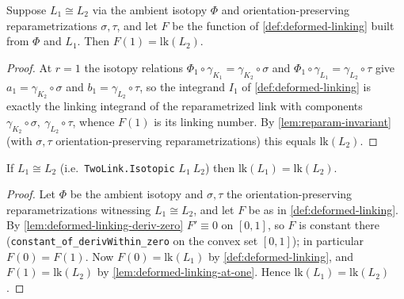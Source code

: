 \begin{lemma}[The deformed linking integral at $r=1$]
    \label{lem:deformed-linking-at-one}
    Suppose $L_1\cong L_2$ via the ambient isotopy $\Phi$ and orientation-preserving
    reparametrizations $\sigma,\tau$, and let $F$ be the function of
    \cref{def:deformed-linking} built from $\Phi$ and $L_1$. Then
    $F(1) = \mathrm{lk}(L_2)$.
\end{lemma}
\begin{proof}
    At $r=1$ the isotopy relations
    $\Phi_1\circ\gamma_{K_1}=\gamma_{K_2}\circ\sigma$ and
    $\Phi_1\circ\gamma_{L_1}=\gamma_{L_2}\circ\tau$ give $a_1=\gamma_{K_2}\circ\sigma$
    and $b_1=\gamma_{L_2}\circ\tau$, so the integrand $I_1$ of
    \cref{def:deformed-linking} is exactly the linking integrand of the
    reparametrized link with components $\gamma_{K_2}\circ\sigma,\
    \gamma_{L_2}\circ\tau$, whence $F(1)$ is its linking number. By
    \cref{lem:reparam-invariant} (with $\sigma,\tau$ orientation-preserving
    reparametrizations) this equals $\mathrm{lk}(L_2)$.
\end{proof}

\begin{theorem}
    \label{thm:linking-isotopy-invariant}
    \leanfile{LeanEval/KnotTheory/Linking.lean}
    If $L_1 \cong L_2$ (i.e.\ \texttt{TwoLink.Isotopic} $L_1\ L_2$) then
    $\mathrm{lk}(L_1) = \mathrm{lk}(L_2)$.
\end{theorem}
\begin{proof}
    Let $\Phi$ be the ambient isotopy and $\sigma,\tau$ the orientation-preserving
    reparametrizations witnessing $L_1\cong L_2$, and let $F$ be as in
    \cref{def:deformed-linking}. By \cref{lem:deformed-linking-deriv-zero}
    $F'\equiv 0$ on $[0,1]$, so $F$ is constant there
    (\texttt{constant\_of\_derivWithin\_zero} on the convex set $[0,1]$); in
    particular $F(0)=F(1)$. Now $F(0)=\mathrm{lk}(L_1)$ by
    \cref{def:deformed-linking}, and $F(1)=\mathrm{lk}(L_2)$ by
    \cref{lem:deformed-linking-at-one}. Hence $\mathrm{lk}(L_1)=\mathrm{lk}(L_2)$.
\end{proof}


